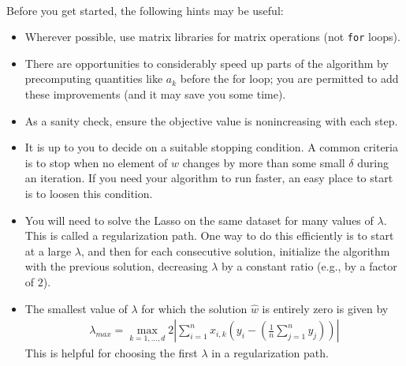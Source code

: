 \documentclass{article}
\begin{document}
\begin{algorithm}[h]
    \caption{Iterative Shrinkage Thresholding Algorithm for Lasso}\label{alg:ista}
    \\
\end{algorithm}

Before you get started, the following hints may be useful:
\begin{itemize}
  \item Wherever possible, use matrix libraries for matrix operations (not \texttt{for} loops).
  \item There are opportunities to considerably speed up parts of the algorithm by precomputing quantities like $a_k$ before the for loop; you are permitted to add these improvements (and it may save you some time).
  \item As a sanity check, ensure the objective value is nonincreasing with each step.
  \item It is up to you to decide on a suitable stopping condition.  A common criteria is to stop when no element of
      ${w}$ changes by more than some small $\delta$ during an iteration.  If you need your algorithm to run faster,
      an easy place to start is to loosen this condition.
  \item You will need to solve the Lasso on the same dataset for many values of $\lambda$.  This
      is called a regularization path.  One way to do this efficiently is to start at a large $\lambda$, and then for each consecutive solution, initialize the algorithm with the previous solution, decreasing $\lambda$ by a constant ratio (e.g., by a factor of $2$).
  \item The smallest value of $\lambda$ for which the solution $\widehat{w}$ is entirely zero is given by
       \begin{align}
           \lambda_{max} = \max_{k=1,\dots,d} 2 \left|\sum_{i=1}^n {x}_{i,k} \left({y}_i - \left(\frac{1}{n} \sum_{j=1}^n y_j \right)\right)\right|\label{eqn:lasso-lambdamax}
       \end{align}
      This is helpful for choosing the first $\lambda$ in a regularization path.
\end{itemize}
\end{document}
